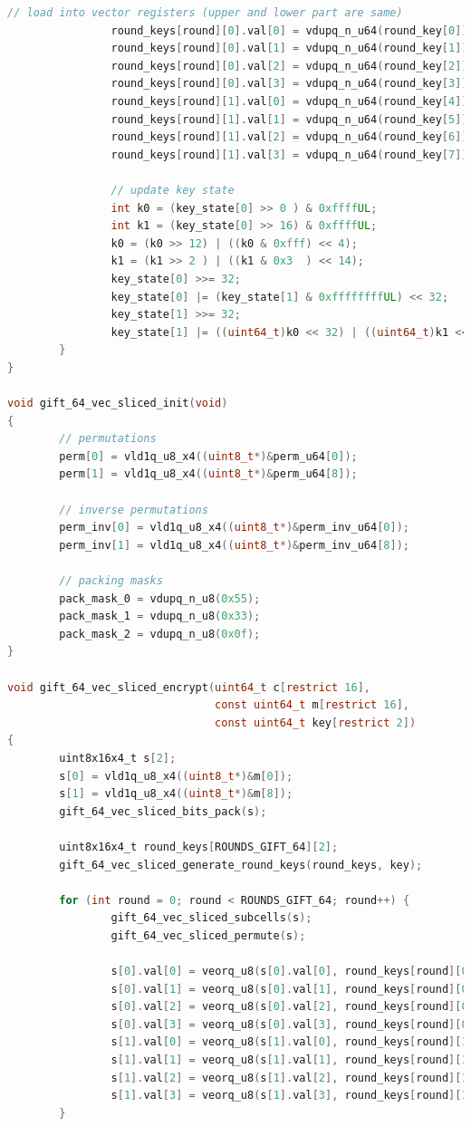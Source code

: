 \documentclass[12pt]{report}
\begin{document}
\begin{lstlisting}[language=c, caption={gift\_vec\_sliced.c}]
                // load into vector registers (upper and lower part are same)
                round_keys[round][0].val[0] = vdupq_n_u64(round_key[0]);
                round_keys[round][0].val[1] = vdupq_n_u64(round_key[1]);
                round_keys[round][0].val[2] = vdupq_n_u64(round_key[2]);
                round_keys[round][0].val[3] = vdupq_n_u64(round_key[3]);
                round_keys[round][1].val[0] = vdupq_n_u64(round_key[4]);
                round_keys[round][1].val[1] = vdupq_n_u64(round_key[5]);
                round_keys[round][1].val[2] = vdupq_n_u64(round_key[6]);
                round_keys[round][1].val[3] = vdupq_n_u64(round_key[7]);

                // update key state
                int k0 = (key_state[0] >> 0 ) & 0xffffUL;
                int k1 = (key_state[0] >> 16) & 0xffffUL;
                k0 = (k0 >> 12) | ((k0 & 0xfff) << 4);
                k1 = (k1 >> 2 ) | ((k1 & 0x3  ) << 14);
                key_state[0] >>= 32;
                key_state[0] |= (key_state[1] & 0xffffffffUL) << 32;
                key_state[1] >>= 32;
                key_state[1] |= ((uint64_t)k0 << 32) | ((uint64_t)k1 << 48);
        }
}

void gift_64_vec_sliced_init(void)
{
        // permutations
        perm[0] = vld1q_u8_x4((uint8_t*)&perm_u64[0]);
        perm[1] = vld1q_u8_x4((uint8_t*)&perm_u64[8]);

        // inverse permutations
        perm_inv[0] = vld1q_u8_x4((uint8_t*)&perm_inv_u64[0]);
        perm_inv[1] = vld1q_u8_x4((uint8_t*)&perm_inv_u64[8]);

        // packing masks
        pack_mask_0 = vdupq_n_u8(0x55);
        pack_mask_1 = vdupq_n_u8(0x33);
        pack_mask_2 = vdupq_n_u8(0x0f);
}

void gift_64_vec_sliced_encrypt(uint64_t c[restrict 16],
                                const uint64_t m[restrict 16],
                                const uint64_t key[restrict 2])
{
        uint8x16x4_t s[2];
        s[0] = vld1q_u8_x4((uint8_t*)&m[0]);
        s[1] = vld1q_u8_x4((uint8_t*)&m[8]);
        gift_64_vec_sliced_bits_pack(s);

        uint8x16x4_t round_keys[ROUNDS_GIFT_64][2];
        gift_64_vec_sliced_generate_round_keys(round_keys, key);

        for (int round = 0; round < ROUNDS_GIFT_64; round++) {
                gift_64_vec_sliced_subcells(s);
                gift_64_vec_sliced_permute(s);

                s[0].val[0] = veorq_u8(s[0].val[0], round_keys[round][0].val[0]);
                s[0].val[1] = veorq_u8(s[0].val[1], round_keys[round][0].val[1]);
                s[0].val[2] = veorq_u8(s[0].val[2], round_keys[round][0].val[2]);
                s[0].val[3] = veorq_u8(s[0].val[3], round_keys[round][0].val[3]);
                s[1].val[0] = veorq_u8(s[1].val[0], round_keys[round][1].val[0]);
                s[1].val[1] = veorq_u8(s[1].val[1], round_keys[round][1].val[1]);
                s[1].val[2] = veorq_u8(s[1].val[2], round_keys[round][1].val[2]);
                s[1].val[3] = veorq_u8(s[1].val[3], round_keys[round][1].val[3]);
        }


\end{lstlisting}
\end{document}
